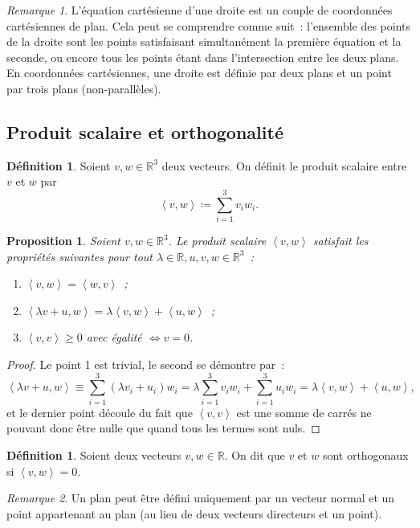 \documentclass{article}
\newcommand{\R}{\mathbb R}
\newcommand{\scpr}[2]{\left\langle #1, #2\right\rangle}
\newtheorem{prp}[thm]{Proposition}
\theoremstyle{definition}
\newtheorem{déf}[thm]{Définition}
\theoremstyle{remark}
\newtheorem*{rmq}{Remarque}
\begin{document}
		\begin{rmq} L'équation cartésienne d'une droite est un couple de coordonnées cartésiennes de plan. Cela peut se comprendre comme suit~: l'ensemble des points de
		la droite sont les points satisfaisant simultanément la première équation et la seconde, ou encore tous les points étant dans l'intersection entre les deux plans.
		En coordonnées cartésiennes, une droite est définie par deux plans et un point par trois plans (non-parallèles). \end{rmq}
	
	\subsection{Produit scalaire et orthogonalité}
		\begin{déf} Soient $v, w \in \R^3$ deux vecteurs. On définit le produit scalaire entre $v$ et $w$ par \[\scpr vw \coloneqq \sum_{i=1}^3v_iw_i.\] \end{déf}

		\begin{prp} Soient $v, w \in \R^3$. Le produit scalaire $\scpr vw$ satisfait les propriétés suivantes pour tout $\lambda \in \R, u, v ,w \in \R^3$~:
		\begin{enumerate}
			\item $\scpr vw = \scpr wv$~;
			\item $\scpr {\lambda v+u}w = \lambda \scpr vw + \scpr uw$~;
			\item $\scpr vv \geq 0$ avec égalité $\iff v = 0$.
		\end{enumerate}
		\end{prp}

		\begin{proof} Le point 1 est trivial, le second se démontre par~:
		\[\scpr {\lambda v+u}w \equiv \sum_{i=1}^3(\lambda v_i + u_i)w_i = \lambda \sum_{i=1}^3v_iw_i + \sum_{i=1}^3u_iw_i = \lambda \scpr vw + \scpr uw,\]
		et le dernier point découle du fait que $\scpr vv$ est une somme de carrés ne pouvant donc être nulle que quand tous les termes sont nuls. \end{proof}

		\begin{déf} Soient deux vecteurs $v, w \in \R$. On dit que $v$ et $w$ sont orthogonaux si $\scpr vw = 0$. \end{déf}

		\begin{rmq} Un plan peut être défini uniquement par un vecteur normal et un point appartenant au plan (au lieu de deux vecteurs directeurs et un point). \end{rmq}
\end{document}
